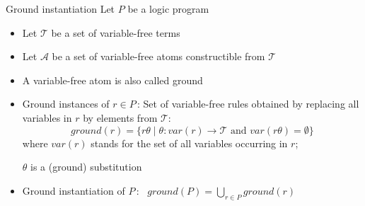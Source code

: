 \begin{frame}{Ground instantiation}
  Let $P$ be a logic program
  \begin{itemize}
  \item<1-> Let $\mathcal{T}$ be a set of variable-free \alert<1-2>{terms}
  \item<1-> Let $\mathcal{A}$ be a set of variable-free \alert<1-2>{atoms} constructible from $\mathcal{T}$
    \smallskip
  \item<2-> A variable-free atom is also called \alert{ground}
    \medskip
  \item<3-> \alert<3>{Ground instances} of $r\in P$\,: Set of variable-free rules obtained by
    replacing all variables in $r$ by elements from $\mathcal{T}$:
    \[
    \mathit{ground}(r)=\{r\theta\mid\theta:\mathit{var}(r)\rightarrow \mathcal{T} \text{ and } \mathit{var}(r\theta)=\emptyset\}
    \]
    where $\mathit{var}(r)$ stands for the set of all variables occurring in $r$;

    $\theta$ is a (ground) substitution
    \medskip
  \item<4-> \alert{Ground instantiation} of $P$\,: \
    \(
    \mathit{ground}(P)=\textstyle\bigcup_{r\in P}\mathit{ground}(r)
    \)
  \end{itemize}
\end{frame}

